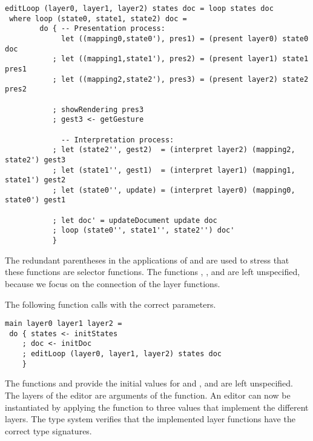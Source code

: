\begin{small}
\begin{verbatim}
editLoop (layer0, layer1, layer2) states doc = loop states doc
 where loop (state0, state1, state2) doc = 
        do { -- Presentation process:
             let ((mapping0,state0'), pres1) = (present layer0) state0 doc
           ; let ((mapping1,state1'), pres2) = (present layer1) state1 pres1
           ; let ((mapping2,state2'), pres3) = (present layer2) state2 pres2

           ; showRendering pres3
           ; gest3 <- getGesture
 
             -- Interpretation process:
           ; let (state2'', gest2)  = (interpret layer2) (mapping2, state2') gest3
           ; let (state1'', gest1)  = (interpret layer1) (mapping1, state1') gest2
           ; let (state0'', update) = (interpret layer0) (mapping0, state0') gest1
       
           ; let doc' = updateDocument update doc
           ; loop (state0'', state1'', state2'') doc'
           }
\end{verbatim}
\end{small}


The redundant parentheses in the applications of  and  are used to stress that these functions are selector functions. The functions , , and  are left unspecified, because we focus on the connection of the layer functions. 

The following function  calls  with the correct parameters.

\begin{small}
\begin{verbatim}
main layer0 layer1 layer2 = 
 do { states <- initStates
    ; doc <- initDoc 
    ; editLoop (layer0, layer1, layer2) states doc
    }
\end{verbatim}
\end{small}

The functions  and  provide the initial values for  and , and are left unspecified. The layers of the editor are arguments of the  function. An editor can now be instantiated by applying the function  to three  values that implement the different layers. The type system verifies that the implemented layer functions have the correct type signatures.

